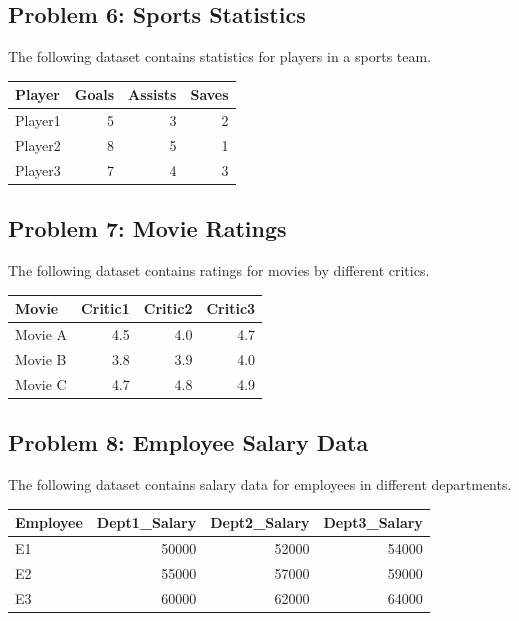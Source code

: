 \documentclass[
  letterpaper,
  DIV=11,
  numbers=noendperiod]{scrreprt}
\begin{document}
\subsection*{Problem 6: Sports
Statistics}\label{problem-6-sports-statistics}

The following dataset contains statistics for players in a sports team.

\begin{table}
\centering
\begin{tabular}{l|r|r|r}
\hline
Player & Goals & Assists & Saves\\
\hline
Player1 & 5 & 3 & 2\\
\hline
Player2 & 8 & 5 & 1\\
\hline
Player3 & 7 & 4 & 3\\
\hline
\end{tabular}
\end{table}

\subsection*{Problem 7: Movie Ratings}\label{problem-7-movie-ratings}

The following dataset contains ratings for movies by different critics.

\begin{table}
\centering
\begin{tabular}{l|r|r|r}
\hline
Movie & Critic1 & Critic2 & Critic3\\
\hline
Movie A & 4.5 & 4.0 & 4.7\\
\hline
Movie B & 3.8 & 3.9 & 4.0\\
\hline
Movie C & 4.7 & 4.8 & 4.9\\
\hline
\end{tabular}
\end{table}

\subsection*{Problem 8: Employee Salary
Data}\label{problem-8-employee-salary-data}

The following dataset contains salary data for employees in different
departments.

\begin{table}
\centering
\begin{tabular}{l|r|r|r}
\hline
Employee & Dept1\_Salary & Dept2\_Salary & Dept3\_Salary\\
\hline
E1 & 50000 & 52000 & 54000\\
\hline
E2 & 55000 & 57000 & 59000\\
\hline
E3 & 60000 & 62000 & 64000\\
\hline
\end{tabular}
\end{table}
\end{document}
